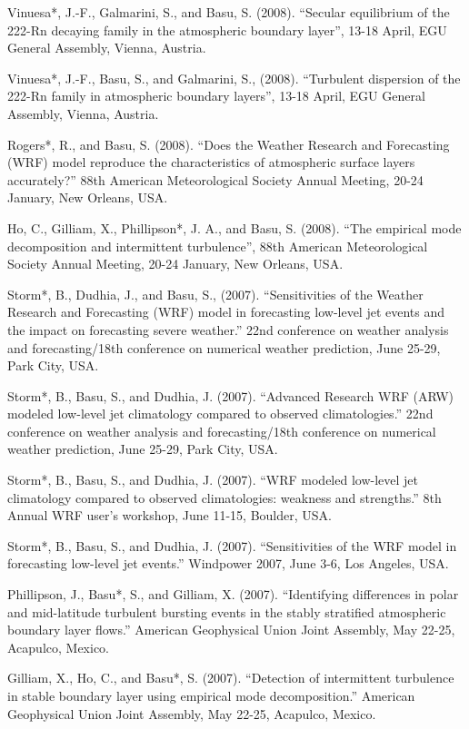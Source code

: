 \begin{etaremune}[topsep=0pt,itemsep=0pt,partopsep=0pt,parsep=0pt]
\item Vinuesa*, J.-F., Galmarini, S., and Basu, S. (2008). ``Secular equilibrium of the 222-Rn decaying family in the atmospheric boundary layer'', 13-18 April, EGU General Assembly, Vienna, Austria. 
\item Vinuesa*, J.-F., Basu, S., and Galmarini, S., (2008). ``Turbulent dispersion of the 222-Rn family in atmospheric boundary layers'', 13-18 April, EGU General Assembly, Vienna, Austria.
\item Rogers*, R., and Basu, S. (2008). ``Does the Weather Research and Forecasting (WRF) model reproduce the characteristics of atmospheric surface layers accurately?'' 88th American Meteorological Society Annual Meeting, 20-24 January, New Orleans, USA.
\item Ho, C., Gilliam, X., Phillipson*, J. A., and Basu, S. (2008). ``The empirical mode decomposition and intermittent turbulence'', 88th American Meteorological Society Annual Meeting, 20-24 January, New Orleans, USA.
\item Storm*, B., Dudhia, J., and Basu, S., (2007). ``Sensitivities of the Weather Research and Forecasting (WRF) model in forecasting low-level jet events and the impact on forecasting severe weather.'' 22nd conference on weather analysis and forecasting/18th conference on numerical weather prediction, June 25-29, Park City, USA.
\item Storm*, B., Basu, S., and Dudhia, J. (2007). ``Advanced Research WRF (ARW) modeled low-level jet climatology compared to observed climatologies.'' 22nd conference on weather analysis and forecasting/18th conference on numerical weather prediction, June 25-29, Park City, USA.
\item Storm*, B., Basu, S., and Dudhia, J. (2007). ``WRF modeled low-level jet climatology compared to observed climatologies: weakness and strengths.'' 8th Annual WRF user's workshop, June 11-15, Boulder, USA.
\item Storm*, B., Basu, S., and Dudhia, J. (2007). ``Sensitivities of the WRF model in forecasting low-level jet events.'' Windpower 2007, June 3-6, Los Angeles, USA.
\item Phillipson, J., Basu*, S., and Gilliam, X. (2007). ``Identifying differences in polar and mid-latitude turbulent bursting events in the stably stratified atmospheric boundary layer flows.'' American Geophysical Union Joint Assembly, May 22-25, Acapulco, Mexico.
\item Gilliam, X., Ho, C., and Basu*, S. (2007). ``Detection of intermittent turbulence in stable boundary layer using empirical mode decomposition.'' American Geophysical Union Joint Assembly, May 22-25, Acapulco, Mexico.

\end{etaremune}
